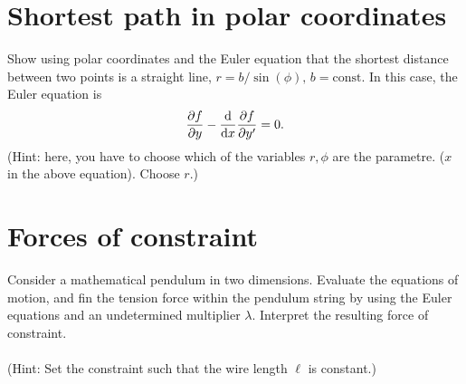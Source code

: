 \documentclass{article}
\begin{document}
    \section{Shortest path in polar coordinates}
        Show using polar coordinates and the Euler equation that the shortest distance between two points is a straight line, $r = b / \sin(\phi), \, b = \mathrm{const}$. In this case, the Euler equation is
        \begin{equation*}
            \pdv{f}{y} - \dv{x} \pdv{f}{y'} = 0.
        \end{equation*}
        (Hint: here, you have to choose which of the variables $r, \phi$ are the parametre. ($x$ in the above equation). Choose $r$.)

    \section{Forces of constraint}
        Consider a mathematical pendulum in two dimensions. Evaluate the equations of motion, and fin the tension force within the pendulum string by using the Euler equations and an undetermined multiplier $\lambda$. Interpret the resulting force of constraint. \\ \\ 
        (Hint: Set the constraint such that the wire length $\ell$ is constant.)
\end{document}

